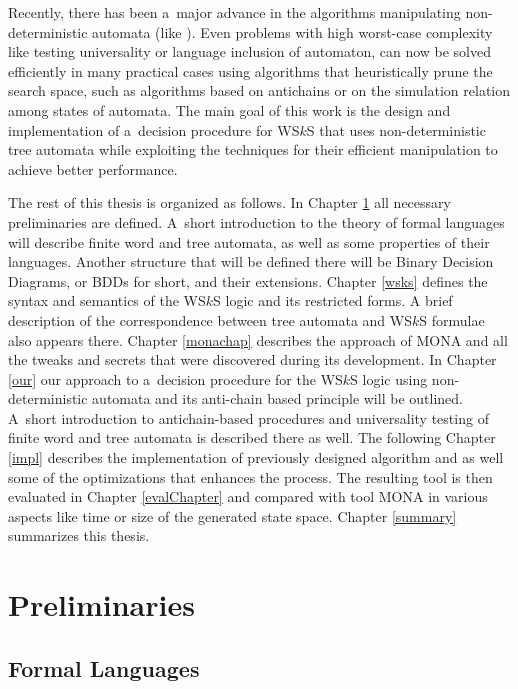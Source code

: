 Recently, there has been a~major advance in the algorithms manipulating
non-deter\-mi\-ni\-stic automata (like \cite{vata}). Even problems with high
worst-case complexity like testing universality or language inclusion of
automaton, can now be solved efficiently in many practical cases using
algorithms that heuristically prune the search space, such as algorithms based
on antichains or on the simulation relation among states of automata.
\newpage
The main goal of this work is the design and implementation of a~decision
procedure for WS$k$S that uses non-deterministic tree automata while exploiting
the techniques for their efficient manipulation to achieve better performance.

The rest of this thesis is organized as follows. In Chapter \ref{preli} all
necessary preliminaries are defined. A~short introduction to the theory of
formal languages will describe finite word and tree automata, as well as some
properties of their languages. Another structure that will be defined there will
be Binary Decision Diagrams, or BDDs for short, and their extensions. Chapter
\ref{wsks} defines the syntax and semantics of the WS$k$S logic and its restricted
forms. A brief description of the correspondence between tree automata and
WS$k$S formulae also appears there.
Chapter \ref{monachap} describes the approach of \textsc{MONA} and all the
tweaks and secrets that were discovered during its development. In Chapter
\ref{our} our approach to a~decision procedure for the WS$k$S logic using
non-deterministic automata and its anti-chain based principle will be outlined.
A~short introduction to antichain-based procedures and universality testing of
finite word and tree automata is described there as well. The following
Chapter \ref{impl} describes the implementation of previously designed
algorithm and as well some of the optimizations that enhances the
process. The resulting tool is then evaluated in Chapter
\ref{evalChapter} and compared with tool \textsc{MONA} in various aspects like
time or size of the generated state space.
Chapter \ref{summary} summarizes this thesis.

\chapter{Preliminaries}\label{preli}

 \section{Formal Languages}

